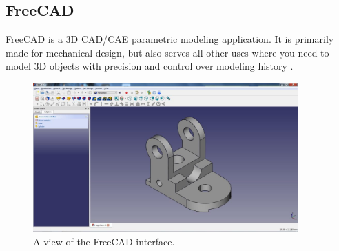 \subsection{FreeCAD}
FreeCAD is a 3D CAD/CAE parametric modeling application. It is primarily made for mechanical design, but also serves all other uses where you need to model 3D objects with precision and control over modeling history \cite{freecad}.

 \begin{figure}[!h]
\begin{center}
\includegraphics[width=4in]{figures02/freecad.jpg}
\caption{A view of the FreeCAD interface.}
\end{center}
\end{figure}
